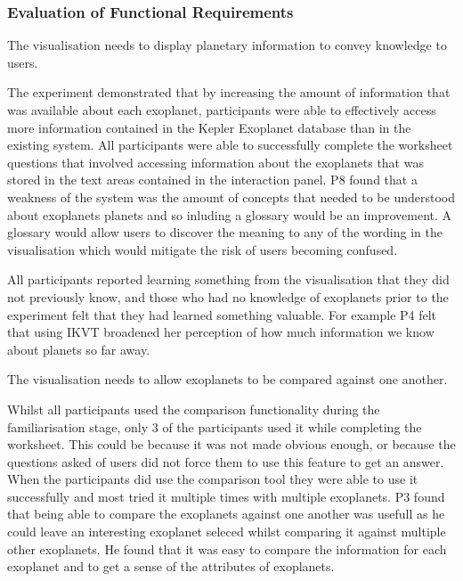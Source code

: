 \subsubsection{Evaluation of Functional Requirements}
\begin{enumerate}
{\bf
 \item[R1.] The visualisation needs to display planetary information to convey
knowledge to users.}

The experiment demonstrated that by increasing the amount of information that
was available about each exoplanet, participants were able to effectively access
more
information contained in the Kepler Exoplanet database than in the existing
system. All participants were able to successfully complete the worksheet
questions
that involved accessing information about the exoplanets that was stored in the
text areas contained in the interaction panel.
P8 found that a weakness of the system was the amount of concepts that needed
to be understood about exoplanets planets and so inluding a glossary would be an
improvement. A glossary would allow users to discover the meaning to any of the
wording in the visualisation which would mitigate the risk of users becoming
confused.

All participants reported learning something from the visualisation that they
did not previously know, and those who had no knowledge of exoplanets prior to
the experiment felt that they had learned something valuable. For example P4
felt that using IKVT broadened her perception of how much information we know
about planets so far away.


{\bf
 \item[R2.] The visualisation needs to allow exoplanets to be compared against
one another.}

Whilst all participants used the comparison functionality during the
familiarisation stage, only 3 of the participants used it while completing the
worksheet. This could be because it was not made obvious enough, or because the
questions asked of users did not force them to use this feature to get an
answer. When the participants did use the comparison tool they were able to use
it successfully and most tried it multiple times with multiple exoplanets. P3
found that being able to compare the exoplanets against one another was usefull
as he could leave an interesting exoplanet seleced whilst comparing it against
multiple other exoplanets. He found that it was easy to compare the information
for each exoplanet and to get a sense of the attributes of exoplanets.


\end{enumerate}
